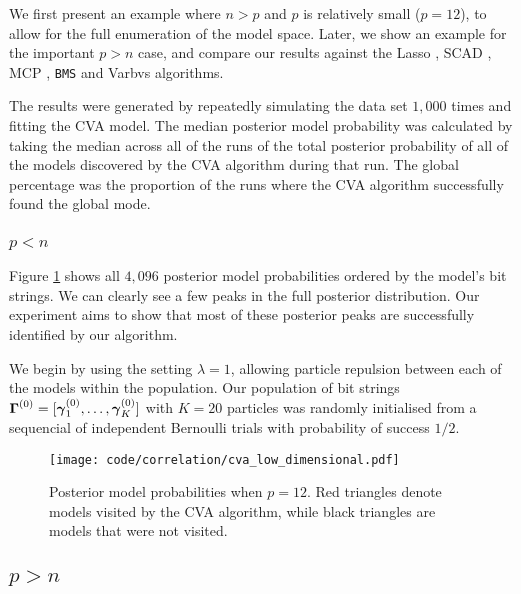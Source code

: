 We first present an example where $n > p$ and $p$ is relatively small ($p = 12$), to allow for the full
enumeration of the model space. Later, we show an example for the important $p > n$ case, and compare our
results  against the Lasso \cite{Tibshirani1996}, SCAD \cite{Fan2001}, MCP \cite{Zhang2010}, {\tt BMS}
\cite{Zeugner2015} and Varbvs algorithms.

The results were generated by repeatedly simulating the data set $1,000$ times and fitting the CVA model.
The median posterior model probability was calculated by taking the median across all of the runs of the
total posterior probability of all of the models discovered by the CVA algorithm during that run. The global
percentage was the proportion of the runs where the CVA algorithm successfully found the global mode.

\subsubsection{$p < n$}
Figure \ref{fig:cva_posterior_models} shows all $4,096$ posterior model probabilities ordered by the model's bit
strings. We can clearly see a few peaks in the full posterior distribution. Our experiment aims to show that
most of these posterior peaks are successfully identified by our algorithm.

We begin by using the setting $\lambda = 1$, allowing particle repulsion between each of the models within the
population. Our population of bit strings ${\boldsymbol \Gamma}^{(0)} = [{\boldsymbol \gamma}_1^{(0)}, \ldots, {\boldsymbol \gamma}_K^{(0)}]$ with
$K = 20$ particles was randomly initialised from a sequencial of independent Bernoulli trials with probability
of success $1/2$.

\begin{figure}	
	\caption{Posterior model probabilities when $p = 12$. Red triangles denote models visited by the CVA
						algorithm, while black triangles are models that were not visited.}
	\label{fig:cva_posterior_models}
	\texttt{[image: code/correlation/cva\_low\_dimensional.pdf]}
\end{figure}

\subsection{$p > n$}

